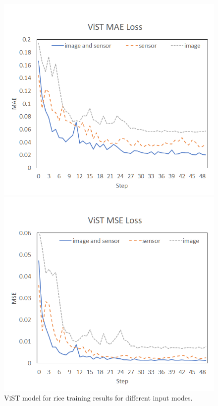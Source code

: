 \documentclass[acmsmall,manuscript, screen, review]{acmart}
\begin{document}
   \begin{figure}[htbp]
    \centering
    \begin{minipage}{0.49\linewidth}
      \centering
      \includegraphics[width=\linewidth]{pic/res_rice_vist_mae.png}
    \end{minipage}
    \centering
    \begin{minipage}{0.49\linewidth}
      \centering
      \includegraphics[width=\linewidth]{pic/res_rice_vist_mse.png}
    \end{minipage}
    \caption{ViST model for rice training results for different input modes. \label{Rice_ViST_results}}
  \end{figure}
\end{document}
